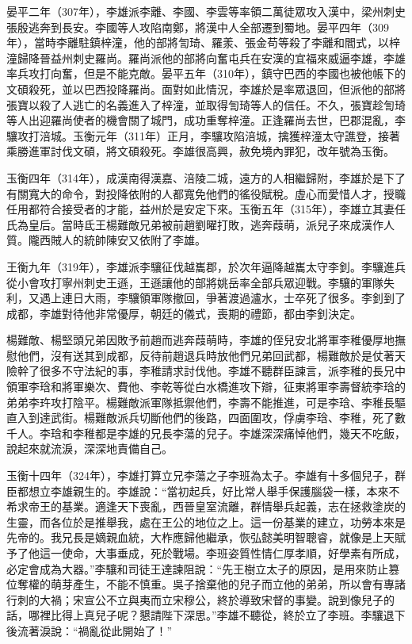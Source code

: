 晏平二年（307年），李雄派李離、李國、李雲等率領二萬徒眾攻入漢中，梁州刺史張殷逃奔到長安。李國等人攻陷南鄭，將漢中人全部遷到蜀地。晏平四年（309年），當時李離駐鎮梓潼，他的部將訇琦、羅羕、張金苟等殺了李離和閻式，以梓潼歸降晉益州刺史羅尚。羅尚派他的部將向奮屯兵在安漢的宜福來威逼李雄，李雄率兵攻打向奮，但是不能克敵。晏平五年（310年），鎮守巴西的李國也被他帳下的文碩殺死，並以巴西投降羅尚。面對如此情況，李雄於是率眾退回，但派他的部將張寶以殺了人逃亡的名義進入了梓潼，並取得訇琦等人的信任。不久，張寶趁訇琦等人出迎羅尚使者的機會關了城門，成功重奪梓潼。正逢羅尚去世，巴郡混亂，李驤攻打涪城。玉衡元年（311年）正月，李驤攻陷涪城，擒獲梓潼太守譙登，接著乘勝進軍討伐文碩，將文碩殺死。李雄很高興，赦免境內罪犯，改年號為玉衡。

玉衡四年（314年），成漢南得漢嘉、涪陵二城，遠方的人相繼歸附，李雄於是下了有關寬大的命令，對投降依附的人都寬免他們的徭役賦稅。虛心而愛惜人才，授職任用都符合接受者的才能，益州於是安定下來。玉衡五年（315年），李雄立其妻任氏為皇后。當時氐王楊難敵兄弟被前趙劉曜打敗，逃奔葭萌，派兒子來成漢作人質。隴西賊人的統帥陳安又依附了李雄。

王衡九年（319年），李雄派李驤征伐越巂郡，於次年逼降越巂太守李釗。李驤進兵從小會攻打寧州刺史王遜，王遜讓他的部將姚岳率全部兵眾迎戰。李驤的軍隊失利，又遇上連日大雨，李驤領軍隊撤回，爭著渡過瀘水，士卒死了很多。李釗到了成都，李雄對待他非常優厚，朝廷的儀式，喪期的禮節，都由李釗決定。

楊難敵、楊堅頭兄弟因敗予前趙而逃奔葭萌時，李雄的侄兒安北將軍李稚優厚地撫慰他們，沒有送其到成都，反待前趙退兵時放他們兄弟回武都，楊難敵於是仗著天險幹了很多不守法紀的事，李稚請求討伐他。李雄不聽群臣諫言，派李稚的長兄中領軍李琀和將軍樂次、費他、李乾等從白水橋進攻下辯，征東將軍李壽督統李琀的弟弟李玝攻打陰平。楊難敵派軍隊抵禦他們，李壽不能推進，可是李琀、李稚長驅直入到達武街。楊難敵派兵切斷他們的後路，四面圍攻，俘虜李琀、李稚，死了數千人。李琀和李稚都是李雄的兄長李蕩的兒子。李雄深深痛悼他們，幾天不吃飯，說起來就流淚，深深地責備自己。

玉衡十四年（324年），李雄打算立兄李蕩之子李班為太子。李雄有十多個兒子，群臣都想立李雄親生的。李雄說：“當初起兵，好比常人舉手保護腦袋一樣，本來不希求帝王的基業。適逢天下喪亂，西晉皇室流離，群情舉兵起義，志在拯救塗炭的生靈，而各位於是推舉我，處在王公的地位之上。這一份基業的建立，功勞本來是先帝的。我兄長是嫡親血統，大柞應歸他繼承，恢弘懿美明智聰睿，就像是上天賦予了他這一使命，大事垂成，死於戰場。李班姿質性情仁厚孝順，好學素有所成，必定會成為大器。”李驤和司徒王達諫阻說：“先王樹立太子的原因，是用來防止篡位奪權的萌芽產生，不能不慎重。吳子捨棄他的兒子而立他的弟弟，所以會有專諸行刺的大禍；宋宣公不立與夷而立宋穆公，終於導致宋督的事變。說到像兒子的話，哪裡比得上真兒子呢？懇請陛下深思。”李雄不聽從，終於立了李班。李驤退下後流著淚說：“禍亂從此開始了！”

